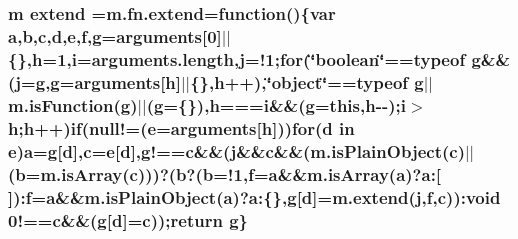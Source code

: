 \hypertarget{static_2root_2js_2jquery-1_811_81_8min_8js_a167947be5252c14d5389d8a01a8c8545}{
\subsubsection[{extend}]{ {\bf m} extend =m.\-fn.\-extend=function()\{var {\bf a},{\bf b},{\bf c},{\bf d},{\bf e},{\bf f},{\bf g}=arguments\mbox{[}0\mbox{]}$\vert$$\vert$\{\},{\bf h}=1,{\bf i}=arguments.\-length,{\bf j}=!1;{\bf for}(\char`\"{}boolean\char`\"{}==typeof {\bf g}\&\&({\bf j}={\bf g},{\bf g}=arguments\mbox{[}{\bf h}\mbox{]}$\vert$$\vert$\{\},{\bf h}++),\char`\"{}object\char`\"{}==typeof {\bf g}$\vert$$\vert$m.\-is\-Function({\bf g})$\vert$$\vert$({\bf g}=\{\}),{\bf h}==={\bf i}\&\&({\bf g}=this,{\bf h}-\/-\/);{\bf i}$>${\bf h};{\bf h}++){\bf if}(null!=({\bf e}=arguments\mbox{[}{\bf h}\mbox{]})){\bf for}({\bf d} in {\bf e}){\bf a}={\bf g}\mbox{[}{\bf d}\mbox{]},{\bf c}={\bf e}\mbox{[}{\bf d}\mbox{]},g!=={\bf c}\&\&({\bf j}\&\&{\bf c}\&\&(m.\-is\-Plain\-Object({\bf c})$\vert$$\vert$({\bf b}=m.\-is\-Array({\bf c})))?({\bf b}?({\bf b}=!1,{\bf f}={\bf a}\&\&m.\-is\-Array({\bf a})?a\-:\mbox{[}$\,$\mbox{]})\-:{\bf f}={\bf a}\&\&m.\-is\-Plain\-Object({\bf a})?a\-:\{\},{\bf g}\mbox{[}{\bf d}\mbox{]}=m.\-extend({\bf j},{\bf f},{\bf c}))\-:void 0!=={\bf c}\&\&({\bf g}\mbox{[}{\bf d}\mbox{]}={\bf c}));return {\bf g}\}}}\label{static_2root_2js_2jquery-1_811_81_8min_8js_a167947be5252c14d5389d8a01a8c8545}
